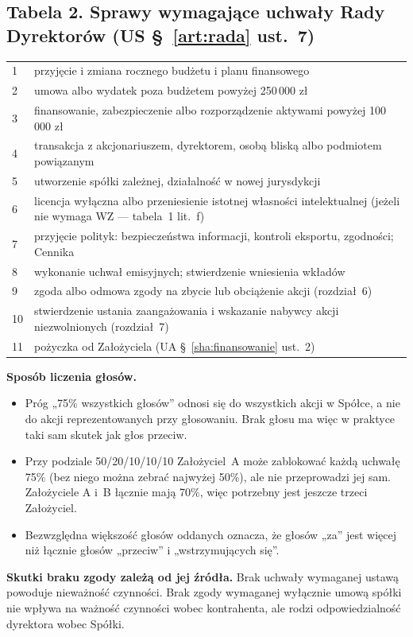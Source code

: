 \documentclass[11pt,a4paper]{report}
\begin{document}
\subsection*{Tabela 2. Sprawy wymagające uchwały Rady Dyrektorów (US §~\ref{art:rada} ust.~7)}
\begin{tabularx}{\linewidth}{@{}p{0.6cm} X@{}}
\toprule
1 & przyjęcie i zmiana rocznego budżetu i planu finansowego \\
2 & umowa albo wydatek poza budżetem powyżej 250\,000 zł \\
3 & finansowanie, zabezpieczenie albo rozporządzenie aktywami powyżej 100\,000 zł \\
4 & transakcja z akcjonariuszem, dyrektorem, osobą bliską albo podmiotem powiązanym \\
5 & utworzenie spółki zależnej, działalność w nowej jurysdykcji \\
6 & licencja wyłączna albo przeniesienie istotnej własności intelektualnej (jeżeli nie wymaga WZ --- tabela~1 lit.~f) \\
7 & przyjęcie polityk: bezpieczeństwa informacji, kontroli eksportu, zgodności; Cennika \\
8 & wykonanie uchwał emisyjnych; stwierdzenie wniesienia wkładów \\
9 & zgoda albo odmowa zgody na zbycie lub obciążenie akcji (rozdział~6) \\
10 & stwierdzenie ustania zaangażowania i wskazanie nabywcy akcji niezwolnionych (rozdział~7) \\
11 & pożyczka od Założyciela (UA §~\ref{sha:finansowanie} ust.~2) \\
\bottomrule
\end{tabularx}

\begin{OCoChodzi}
\textbf{Sposób liczenia głosów.}
\begin{itemize}
  \item Próg „75\% wszystkich głosów” odnosi się do wszystkich akcji w Spółce, a nie do akcji reprezentowanych przy głosowaniu. Brak głosu ma więc w praktyce taki sam skutek jak głos przeciw.
  \item Przy podziale 50/20/10/10/10 Założyciel~A może zablokować każdą uchwałę 75\% (bez niego można zebrać najwyżej 50\%), ale nie przeprowadzi jej sam. Założyciele A i~B łącznie mają 70\%, więc potrzebny jest jeszcze trzeci Założyciel.
  \item Bezwzględna większość głosów oddanych oznacza, że głosów „za” jest więcej niż łącznie głosów „przeciw” i „wstrzymujących się”.
\end{itemize}
\textbf{Skutki braku zgody zależą od jej źródła.} Brak uchwały wymaganej ustawą powoduje nieważność czynności. Brak zgody wymaganej wyłącznie umową spółki nie wpływa na ważność czynności wobec kontrahenta, ale rodzi odpowiedzialność dyrektora wobec Spółki.
\end{OCoChodzi}
\end{document}
